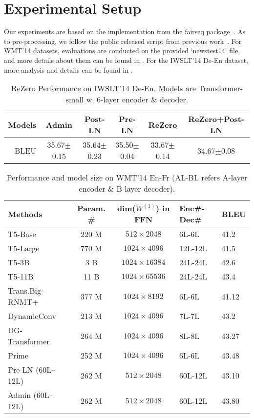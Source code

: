\section{Experimental Setup}
\label{appendix:exp}

Our experiments are based on the implementation from the fairseq package~\citep{ott2019fairseq}.
As to pre-processing, we follow the public released script from previous work~\citep{ott2019fairseq,lu2020understanding}. 
For WMT'14 datasets, evaluations are conducted on the provided `newstest14` file, and more details about them can be found in \citet{bojar2014findings}. 
For the IWSLT'14 De-En dataset, more analysis and details can be found in \citet{cettolo2014report}. 

\begin{table}[t]
\centering
\caption{ReZero Performance on IWSLT'14 De-En. Models are Transformer-small w. 6-layer encoder \& decoder.}
\label{tab:rezero}
\begin{tabular}{r|ccccc}
\toprule
Models & Admin & Post-LN & Pre-LN & ReZero & ReZero+Post-LN \\
\midrule
BLEU & 35.67$\pm$0.15 & 35.64$\pm$0.23 & 35.50$\pm$0.04 & 33.67$\pm$0.14 & 34.67$\pm$0.08 \\
\bottomrule
\end{tabular}
\end{table}

\begin{table}[t]
\centering
\caption{Performance and model size on WMT'14 En-Fr (AL-BL refers A-layer encoder \& B-layer decoder).}
\label{tab:wmt14fr}
\begin{tabularx}{\linewidth}{lccYY}
\toprule
Methods & Param. \# & dim($W^{(1)}$) in FFN & Enc\#-Dec\# & BLEU \\
\midrule
T5-Base~\cite{raffel2019exploring} & 220 M & $512\times2048$ & 6L-6L & 41.2 \\
T5-Large~\cite{raffel2019exploring} & 770 M & $1024\times4096$ & 12L-12L & 41.5 \\
T5-3B~\cite{raffel2019exploring} & 3 B & $1024\times16384$ & 24L-24L & 42.6 \\
T5-11B~\cite{raffel2019exploring} & 11 B & $1024\times65536$ & 24L-24L & 43.4 \\
\midrule
Trans.Big-RNMT+~\cite{Chen2018TheBO} & 377 M &  $1024\times8192$ & 6L-6L & 41.12 \\
DynamicConv~\cite{wu2018pay} & 213 M & $1024\times4096$ & 7L-7L & 43.2 \\
DG-Transformer~\cite{Wu2019DepthGF} & 264 M & $1024\times4096$ & 8L-8L & 43.27 \\
Prime~\cite{zhao2019muse} & 252 M & $1024\times4096$ & 6L-6L & 43.48 \\
\midrule
Pre-LN (60L--12L) & 262 M &  $512\times2048$ & 60L-12L & 43.10 \\
Admin (60L--12L) & 262 M & $512\times2048$ & 60L-12L & 43.80 \\
\bottomrule
\end{tabularx}
\end{table}

